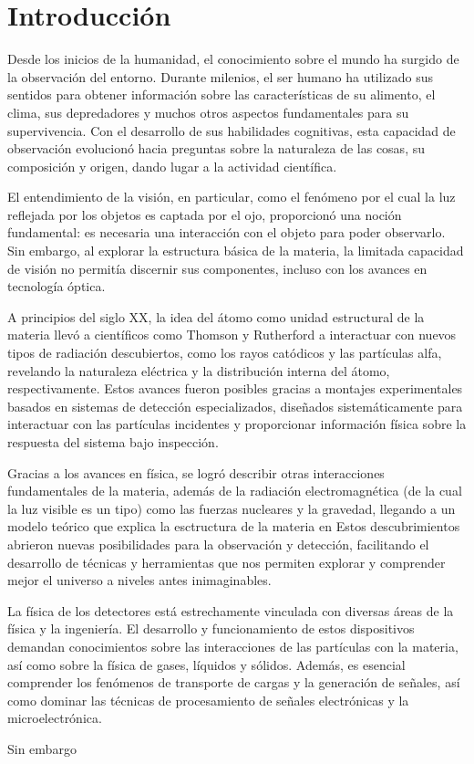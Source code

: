 \documentclass[]{book}
\begin{document}
\chapter{Introducción}

Desde los inicios de la humanidad, el conocimiento sobre el mundo ha surgido de la observación del entorno. Durante milenios, el ser humano ha utilizado sus sentidos para obtener información sobre las características de su alimento, el clima, sus depredadores y muchos otros aspectos fundamentales para su supervivencia. Con el desarrollo de sus habilidades cognitivas, esta capacidad de observación evolucionó hacia preguntas sobre la naturaleza de las cosas, su composición y origen, dando lugar a la actividad científica.

El entendimiento de la visión, en particular, como el fenómeno por el cual la luz reflejada por los objetos es captada por el ojo, proporcionó una noción fundamental: es necesaria una interacción con el objeto para poder observarlo. Sin embargo, al explorar la estructura básica de la materia, la limitada capacidad de visión no permitía discernir sus componentes, incluso con los avances en tecnología óptica.

A principios del siglo XX, la idea del átomo como unidad estructural de la materia llevó a científicos como Thomson y Rutherford a interactuar con nuevos tipos de radiación descubiertos, como los rayos catódicos y las partículas alfa, revelando la naturaleza eléctrica y la distribución interna del átomo, respectivamente. Estos avances fueron posibles gracias a montajes experimentales basados en sistemas de detección especializados, diseñados sistemáticamente para interactuar con las partículas incidentes y proporcionar información física sobre la respuesta del sistema bajo inspección.


Gracias a los avances en física, se logró describir otras interacciones fundamentales de la materia, además 
de la radiación electromagnética (de la cual la luz visible es un tipo) como las fuerzas nucleares y la gravedad, llegando a un modelo teórico que explica la esctructura de la materia en  
Estos descubrimientos abrieron nuevas posibilidades para la observación y detección, facilitando el desarrollo de técnicas y herramientas que nos permiten explorar y comprender mejor el universo a niveles antes inimaginables.

La física de los detectores está estrechamente vinculada con diversas áreas de la física y la ingeniería. 
El desarrollo y funcionamiento de estos dispositivos demandan conocimientos sobre las interacciones de las 
partículas con la materia, así como sobre la física de gases, líquidos y sólidos. Además, es esencial comprender 
los fenómenos de transporte de cargas y la generación de señales, así como dominar las técnicas de procesamiento 
de señales electrónicas y la microelectrónica.

Sin embargo
\end{document}
